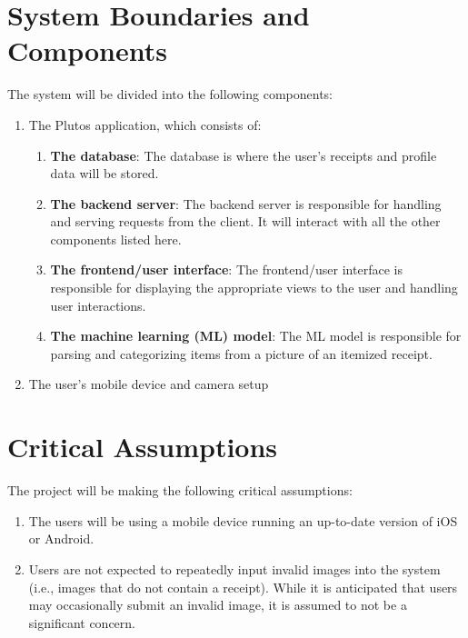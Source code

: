 \documentclass{article}
\begin{document}
\section{System Boundaries and Components}

The system will be divided into the following components:
\begin{enumerate}
    \item The Plutos application, which consists of:
    \begin{enumerate}
        \item \textbf{The database}: The database is where the user’s receipts
        and profile data will be stored.
        \item \textbf{The backend server}: The backend server is responsible for
        handling and serving requests from the client. It will interact with all
        the other components listed here.
        \item \textbf{The frontend/user interface}: The frontend/user interface
        is responsible for displaying the appropriate views to the user and
        handling user interactions.
        \item \textbf{The machine learning (ML) model}: The ML model is
        responsible for parsing and categorizing items from a picture of an
        itemized receipt.
    \end{enumerate}
    \item The user’s mobile device and camera setup
\end{enumerate}


\section{Critical Assumptions}

The project will be making the following critical assumptions: 
\begin{enumerate}
    \item The users will be
    using a mobile device running an up-to-date version of iOS or Android.
    \item Users are
    not expected to repeatedly input invalid images into the system (i.e., images
    that do not contain a receipt). While it is anticipated that users may
    occasionally submit an invalid image, it is assumed to not be a significant
    concern.
\end{enumerate}  
\end{document}
